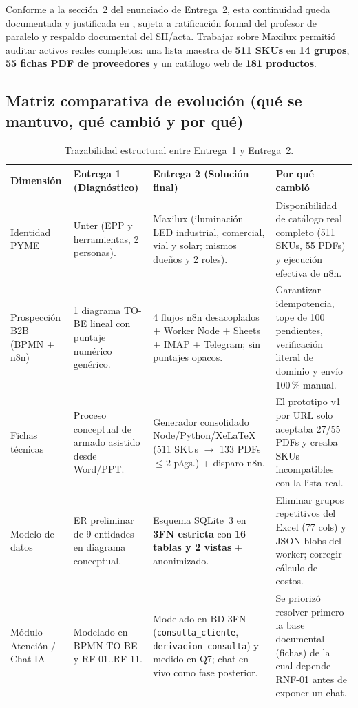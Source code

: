 \documentclass{article}
\begin{document}
Conforme a la sección~2 del enunciado de Entrega~2, esta continuidad queda documentada y justificada en , sujeta a ratificación formal del profesor de paralelo y respaldo documental del SII/acta. Trabajar sobre Maxilux permitió auditar activos reales completos: una lista maestra de \textbf{511 SKUs} en \textbf{14 grupos}, \textbf{55 fichas PDF de proveedores} y un catálogo web de \textbf{181 productos}.

\subsection{Matriz comparativa de evolución (qué se mantuvo, qué cambió y por qué)}

\begin{table}[H]
\centering
\small
\renewcommand{\arraystretch}{1.22}
\begin{tabularx}{\textwidth}{p{2.7cm}p{3.9cm}p{4.3cm}L}
\toprule
\textbf{Dimensión} & \textbf{Entrega 1 (Diagnóstico)} & \textbf{Entrega 2 (Solución final)} & \textbf{Por qué cambió} \\
\midrule
Identidad PYME & Unter (EPP y herramientas, 2 personas). & Maxilux (iluminación LED industrial, comercial, vial y solar; mismos dueños y 2 roles). & Disponibilidad de catálogo real completo (511 SKUs, 55 PDFs) y ejecución efectiva de n8n. \\
\addlinespace
Prospección B2B (BPMN + n8n) & 1 diagrama TO-BE lineal con puntaje numérico genérico. & 4 flujos n8n desacoplados + Worker Node + Sheets + IMAP + Telegram; sin puntajes opacos. & Garantizar idempotencia, tope de 100 pendientes, verificación literal de dominio y envío 100\,\% manual. \\
\addlinespace
Fichas técnicas & Proceso conceptual de armado asistido desde Word/PPT. & Generador consolidado Node/Python/XeLaTeX (511 SKUs $\rightarrow$ 133 PDFs $\le 2$ págs.) + disparo n8n. & El prototipo v1 por URL solo aceptaba 27/55 PDFs y creaba SKUs incompatibles con la lista real. \\
\addlinespace
Modelo de datos & ER preliminar de 9 entidades en diagrama conceptual. & Esquema SQLite~3 en \textbf{3FN estricta} con \textbf{16 tablas y 2 vistas} +  anonimizado. & Eliminar grupos repetitivos del Excel (77 cols) y JSON blobs del worker; corregir cálculo de costos. \\
\addlinespace
Módulo Atención / Chat IA & Modelado en BPMN TO-BE y RF-01..RF-11. & Modelado en BD 3FN (\texttt{consulta\_cliente}, \texttt{derivacion\_consulta}) y medido en Q7; chat en vivo como fase posterior. & Se priorizó resolver primero la base documental (fichas) de la cual depende RNF-01 antes de exponer un chat. \\
\bottomrule
\end{tabularx}
\caption{Trazabilidad estructural entre Entrega~1 y Entrega~2.}
\end{table}
\end{document}
